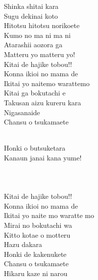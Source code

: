 \begin{multicols}{2}
Shinka shitai kara\\
Sugu dekinai koto\\
Hitotsu hitotsu norikoete\\
Kumo no ma ni ma ni\\
Atarashii aozora ga\\
Matteru yo matteru yo! \\

Kitai de hajike tobou!!\\
Konna ikioi no mama de\\
Ikitai yo naitemo warattemo\\
Kitai ga bokutachi e\\
Takusan aizu kureru kara\\
Nigasanaide\\
Chansu o tsukamaete\\


\\

Honki o butsuketara\\
Kanaun janai kana yume!\\

\\
\\
\\

Kitai de hajike tobou!!\\
Konna ikioi no mama de\\
Ikitai yo naite mo waratte mo\\
Mirai no bokutachi wa\\
Kitto kotae o motteru\\
Hazu dakara\\
Honki de kakenukete\\
Chansu o tsukamaete\\
Hikaru kaze ni narou\\
\end{multicols}

\ifdefined\COMPLETE
\else
	
\fi
